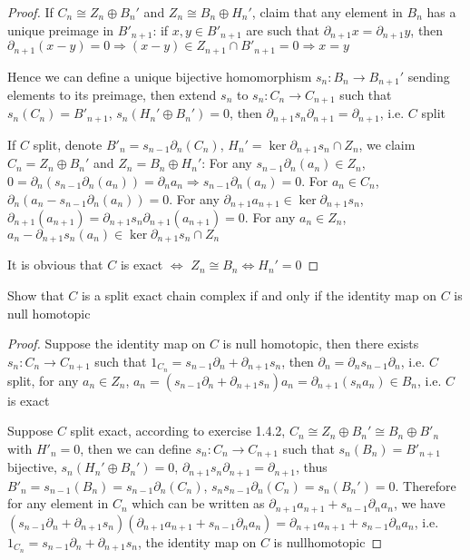 \documentclass{article}
\newenvironment{exercise}[2][Exercise]{\begin{trivlist}
\item[\hskip \labelsep {\bfseries #1}\hskip \labelsep {\bfseries #2.}]}{\end{trivlist}}
\theoremstyle{definition}
\theoremstyle{remark}
\theoremstyle{definition}
\begin{document}
\begin{proof}
If $C_n\cong Z_n\oplus B_n'$ and $Z_n\cong B_n\oplus H_n'$, claim that any element in $B_n$ has a unique preimage in $B'_{n+1}$: if $x,y\in B'_{n+1}$ are such that $\partial_{n+1}x=\partial_{n+1}y$, then $\partial_{n+1}(x-y)=0\Rightarrow (x-y)\in Z_{n+1}\cap B'_{n+1}=0\Rightarrow x=y$ \par
Hence we can define a unique bijective homomorphism $s_n:B_n\to B_{n+1}'$ sending elements to its preimage, then extend $s_n$ to $s_n:C_n\to C_{n+1}$ such that $s_n(C_n)= B'_{n+1}$, $s_{n}(H_n'\oplus B_n')=0$, then $\partial_{n+1}s_n\partial_{n+1}=\partial_{n+1}$, i.e. $C$ split \par
If $C$ split, denote $B'_n=s_{n-1}\partial_n(C_n)$, $H_n'=\ker \partial_{n+1}s_n\cap Z_n$, we claim $C_n= Z_n\oplus B_n'$ and $Z_n=B_n\oplus H_n'$: For any $s_{n-1}\partial_n(a_n)\in Z_n$, $0=\partial_n(s_{n-1}\partial_n(a_n))=\partial_na_n\Rightarrow s_{n-1}\partial_n(a_n)=0$. For $a_n\in C_n$, $\partial_n(a_n-s_{n-1}\partial_n(a_n))=0$. For any $\partial_{n+1}a_{n+1}\in\ker \partial_{n+1}s_n$, $\partial_{n+1}(a_{n+1})=\partial_{n+1}s_n\partial_{n+1}(a_{n+1})=0$. For any $a_n\in Z_n$, $a_n-\partial_{n+1}s_n(a_n)\in\ker \partial_{n+1}s_n\cap Z_n$ \par
It is obvious that $C$ is exact $\Leftrightarrow$ $Z_n\cong B_n\Leftrightarrow H_n'=0$
\end{proof}

\begin{exercise}{\textbf{1.4.3}}
Show that $C$ is a split exact chain complex if and only if the identity map on $C$ is null homotopic 
\end{exercise}

\begin{proof}
Suppose the identity map on $C$ is null homotopic, then there exists $s_n:C_n\to C_{n+1}$ such that $1_{C_n}=s_{n-1}\partial_n+\partial_{n+1}s_n$, then $\partial_n=\partial_ns_{n-1}\partial_n$, i.e. $C$ split, for any $a_n\in Z_n$, $a_n=(s_{n-1}\partial_n+\partial_{n+1}s_n)a_n=\partial_{n+1}(s_na_n)\in B_n$, i.e. $C$ is exact \par
Suppose $C$ split exact, according to exercise 1.4.2, $C_n\cong Z_n\oplus B_n'\cong B_n\oplus B'_n$ with $H'_n=0$, then we can define $s_n:C_n\to C_{n+1}$ such that $s_n(B_n)= B'_{n+1}$ bijective, $s_{n}(H_n'\oplus B_n')=0$, $\partial_{n+1}s_n\partial_{n+1}=\partial_{n+1}$, thus $B'_n=s_{n-1}(B_n)=s_{n-1}\partial_n(C_n)$, $s_ns_{n-1}\partial_n(C_n)=s_n(B_n')=0$. Therefore for any element in $C_n$ which can be written as $\partial_{n+1}a_{n+1}+s_{n-1}\partial_na_n$, we have $(s_{n-1}\partial_n+\partial_{n+1}s_n)(\partial_{n+1}a_{n+1}+s_{n-1}\partial_na_n)=\partial_{n+1}a_{n+1}+s_{n-1}\partial_na_n$, i.e. $1_{C_n}=s_{n-1}\partial_n+\partial_{n+1}s_n$, the identity map on $C$ is nullhomotopic
\end{proof}
\end{document}
